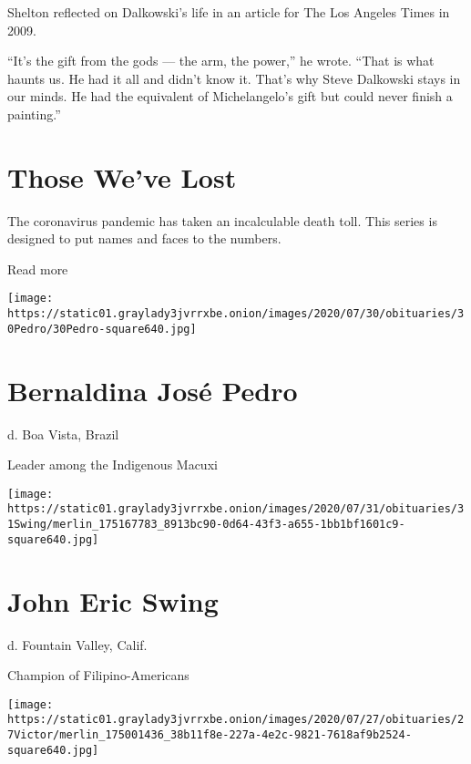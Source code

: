 Shelton reflected on Dalkowski's life in an article for The Los Angeles
Times in 2009.

``It's the gift from the gods --- the arm, the power,'' he wrote. ``That
is what haunts us. He had it all and didn't know it. That's why Steve
Dalkowski stays in our minds. He had the equivalent of Michelangelo's
gift but could never finish a painting.''

\href{https://www.nytimes3xbfgragh.onion/interactive/2020/obituaries/people-died-coronavirus-obituaries.html?action=click\&pgtype=Article\&state=default\&region=BELOW_MAIN_CONTENT\&context=covid_obits_promo}{}

\hypertarget{those-weve-lost}{%
\section{Those We've Lost}\label{those-weve-lost}}

The coronavirus pandemic has taken an incalculable death toll. This
series is designed to put names and faces to the numbers.

Read more

\texttt{[image: https://static01.graylady3jvrrxbe.onion/images/2020/07/30/obituaries/30Pedro/30Pedro-square640.jpg]}

\hypertarget{bernaldina-josuxe9-pedro}{%
\section{Bernaldina José Pedro}\label{bernaldina-josuxe9-pedro}}

d. Boa Vista, Brazil

Leader among the Indigenous Macuxi

\texttt{[image: https://static01.graylady3jvrrxbe.onion/images/2020/07/31/obituaries/31Swing/merlin\_175167783\_8913bc90-0d64-43f3-a655-1bb1bf1601c9-square640.jpg]}

\hypertarget{john-eric-swing}{%
\section{John Eric Swing}\label{john-eric-swing}}

d. Fountain Valley, Calif.

Champion of Filipino-Americans

\texttt{[image: https://static01.graylady3jvrrxbe.onion/images/2020/07/27/obituaries/27Victor/merlin\_175001436\_38b11f8e-227a-4e2c-9821-7618af9b2524-square640.jpg]}

